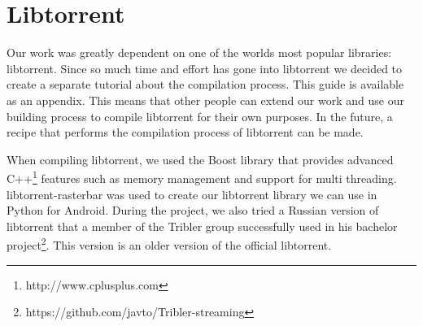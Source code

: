\section{Libtorrent}
	Our work was greatly dependent on one of the worlds most popular libraries: libtorrent. Since so much time and effort has gone into libtorrent  we decided to create a separate tutorial about the compilation process. This guide is available as an appendix. This means that other people can extend our work and use our building process to compile libtorrent for their own purposes. In the future, a recipe that performs the compilation process of libtorrent can be made.
	
	When compiling libtorrent, we used the Boost library that provides advanced C++\footnote{http://www.cplusplus.com} features such as memory management and support for multi threading. libtorrent-rasterbar was used to create our libtorrent library we can use in Python for Android. During the project, we also tried a Russian version of libtorrent that a member of the Tribler group successfully used in his bachelor project\footnote{https://github.com/javto/Tribler-streaming}. This version is an older version of the official libtorrent.